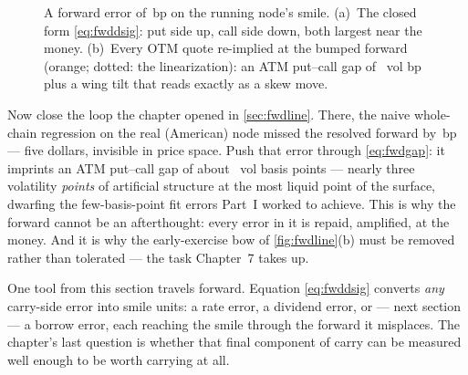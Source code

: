 \begin{figure}[htbp]
\centering
{}
\caption{A forward error of \MacFwdSkewBumpBp\,bp on the running
node's smile.  (a)~The closed form \eqref{eq:fwddsig}: put side up,
call side down, both largest near the money.  (b)~Every OTM quote
re-implied at the bumped forward (orange; dotted: the linearization):
an ATM put--call gap of \MacFwdSkewGapBp\ vol bp plus a wing tilt
that reads exactly as a skew move.}
\label{fig:fwdskew}
\end{figure}

Now close the loop the chapter opened in \cref{sec:fwdline}.  There,
the naive whole-chain regression on the real (American) node missed
the resolved forward by \MacFwdLineGapBp\,bp --- five dollars,
invisible in price space.  Push that error through
\eqref{eq:fwdgap}: it imprints an ATM put--call gap of about
\MacFwdSkewNaiveGapBp\ vol basis points --- nearly three volatility
\emph{points} of artificial structure at the most liquid point of the
surface, dwarfing the few-basis-point fit errors Part~I worked to
achieve.  This is why the forward cannot be an afterthought: every
error in it is repaid, amplified, at the money.  And it is why the
early-exercise bow of \cref{fig:fwdline}(b) must be removed rather
than tolerated --- the task Chapter~7 takes up.

One tool from this section travels forward.  Equation
\eqref{eq:fwddsig} converts \emph{any} carry-side error into smile
units: a rate error, a dividend error, or --- next section --- a
borrow error, each reaching the smile through the forward it
misplaces.  The chapter's last question is whether that final
component of carry can be measured well enough to be worth carrying
at all.
